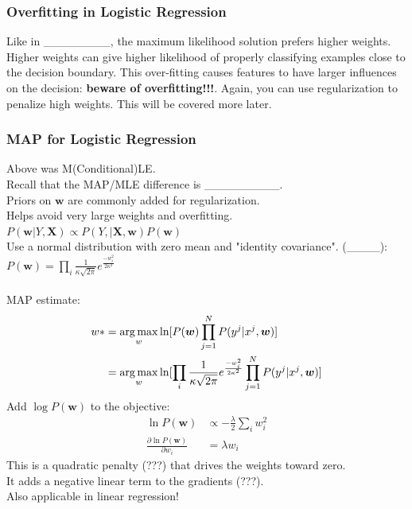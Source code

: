 \subsubsection{Overfitting in Logistic Regression}
Like in \_\_\_\_\_\_\_\_, the maximum likelihood solution prefers higher weights.  
Higher weights can give higher likelihood of properly classifying examples close to the decision boundary.  
This over-fitting causes features to have larger influences on the decision:  \textbf{beware of overfitting!!!}. 
Again, you can use regularization to penalize high weights.
This will be covered more later. 
\hfill \\

\subsubsection{MAP for Logistic Regression}
Above was M(Conditional)LE.     \hfill \\
Recall that the MAP/MLE difference is \_\_\_\_\_\_\_\_\_.  \hfill \\
Priors on $\bm{w}$ are commonly added for regularization.    \hfill \\
Helps avoid very large weights and overfitting.    \hfill \\
$P(\bm{w} | Y, \bm{X}) \propto P(Y, | \bm{X}, \bm{w} ) P(\bm{w} )$  \hfill \\
Use a normal distribution with zero mean and "identity covariance".  (\_\_\_\_):  \hfill \\
$ \displaystyle  P(\bm{w} ) = \prod_i \frac{1}{\kappa \sqrt{2 \pi}} e^{\frac{-w_i^2}{2 \kappa^2}}$ \hfill \\
\hfill \\

MAP estimate: 
\begin{align*}
	w* &= \operatorname*{arg\,max}_w \ln[P(\bm{w}) \prod_{j=1}^N P(y^j | x^j, \bm{w})]  \\
		&= \operatorname*{arg\,max}_w \ln[ \prod_i \frac{1}{\kappa \sqrt{2 \pi}} e^{\frac{-w_i^2}{2 \kappa^2}}   \prod_{j=1}^N P(y^j | x^j, \bm{w})]
\end{align*}
Add $\log P(\bm{w})$ to the objective:
\begin{align*}
	\ln P(\bm{w}) & \propto - \frac{\lambda}{2} \sum_i w_i^2 \\
	\frac{\partial \ln P(\bm{w})}{\partial w_i} &= \lambda w_i
\end{align*}
This is a quadratic penalty (???) that drives the weights toward zero. \hfill \\
It adds a negative linear term to the gradients (???).  \hfill \\
Also applicable in linear regression! 

